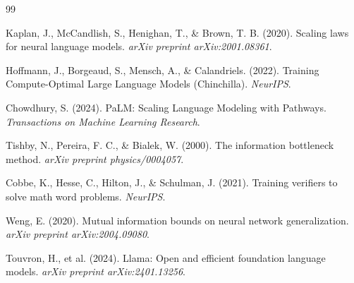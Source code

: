 \documentclass[12pt]{article}
\theoremstyle{definition}
\theoremstyle{remark}
\begin{document}

\begin{thebibliography}{99}

Kaplan, J., McCandlish, S., Henighan, T., \& Brown, T. B. (2020).
Scaling laws for neural language models.
\textit{arXiv preprint arXiv:2001.08361}.

Hoffmann, J., Borgeaud, S., Mensch, A., \& Calandriels. (2022).
Training Compute-Optimal Large Language Models (Chinchilla).
\textit{NeurIPS}.

Chowdhury, S. (2024).
PaLM: Scaling Language Modeling with Pathways.
\textit{Transactions on Machine Learning Research}.

Tishby, N., Pereira, F. C., \& Bialek, W. (2000).
The information bottleneck method.
\textit{arXiv preprint physics/0004057}.

Cobbe, K., Hesse, C., Hilton, J., \& Schulman, J. (2021).
Training verifiers to solve math word problems.
\textit{NeurIPS}.

Weng, E. (2020).
Mutual information bounds on neural network generalization.
\textit{arXiv preprint arXiv:2004.09080}.


Touvron, H., et al. (2024).
Llama: Open and efficient foundation language models.
\textit{arXiv preprint arXiv:2401.13256}.

\end{thebibliography}
\end{document}
